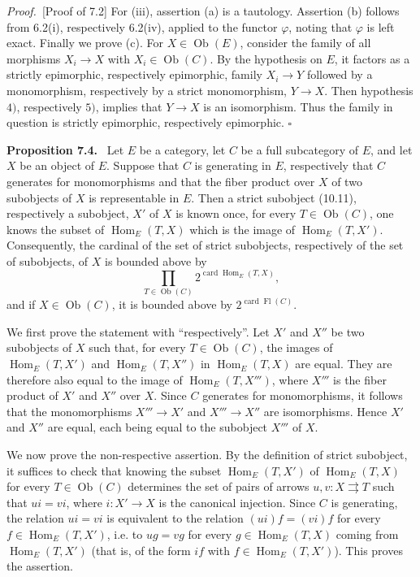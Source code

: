 \documentclass[11pt]{article}
\newcommand{\Ob}{\operatorname{Ob}}
\newcommand{\Hom}{\operatorname{Hom}}
\newcommand{\Fl}{\operatorname{Fl}}
\newcommand{\card}{\operatorname{card}}
\newcommand{\qedtext}{\hfill\(\square\)}
\newenvironment{statement}[1]{\par\medskip\noindent\textbf{#1.}\ }{\par\medskip}
\newenvironment{proofsketch}{\par\noindent\emph{Proof.}\ }{\par\medskip}
\begin{document}
\begin{proofsketch}[Proof of 7.2]
For (iii), assertion (a) is a tautology. Assertion (b) follows from 6.2(i), respectively 6.2(iv), applied to the functor $\varphi$, noting that $\varphi$ is left exact. Finally we prove (c). For $X\in\Ob(E)$, consider the family of all morphisms $X_i\to X$ with $X_i\in\Ob(C)$. By the hypothesis on $E$, it factors as a strictly epimorphic, respectively epimorphic, family $X_i\to Y$ followed by a monomorphism, respectively by a strict monomorphism, $Y\to X$. Then hypothesis $4)$, respectively $5)$, implies that $Y\to X$ is an isomorphism. Thus the family in question is strictly epimorphic, respectively epimorphic. \qedtext
\end{proofsketch}

\begin{statement}{Proposition 7.4}
Let $E$ be a category, let $C$ be a full subcategory of $E$, and let $X$ be an object of $E$. Suppose that $C$ is generating in $E$, respectively that $C$ generates for monomorphisms and that the fiber product over $X$ of two subobjects of $X$ is representable in $E$. Then a strict subobject (10.11), respectively a subobject, $X'$ of $X$ is known once, for every $T\in\Ob(C)$, one knows the subset of $\Hom_E(T,X)$ which is the image of $\Hom_E(T,X')$. Consequently, the cardinal of the set of strict subobjects, respectively of the set of subobjects, of $X$ is bounded above by
\[
\prod_{T\in\Ob(C)}2^{\card\Hom_E(T,X)},
\]
and if $X\in\Ob(C)$, it is bounded above by $2^{\card \Fl(C)}$.
\end{statement}

We first prove the statement with ``respectively''. Let $X'$ and $X''$ be two subobjects of $X$ such that, for every $T\in\Ob(C)$, the images of $\Hom_E(T,X')$ and $\Hom_E(T,X'')$ in $\Hom_E(T,X)$ are equal. They are therefore also equal to the image of $\Hom_E(T,X''')$, where $X'''$ is the fiber product of $X'$ and $X''$ over $X$. Since $C$ generates for monomorphisms, it follows that the monomorphisms $X'''\to X'$ and $X'''\to X''$ are isomorphisms. Hence $X'$ and $X''$ are equal, each being equal to the subobject $X'''$ of $X$.

We now prove the non-respective assertion. By the definition of strict subobject, it suffices to check that knowing the subset $\Hom_E(T,X')$ of $\Hom_E(T,X)$ for every $T\in\Ob(C)$ determines the set of pairs of arrows $u,v:X\rightrightarrows T$ such that $ui=vi$, where $i:X'\to X$ is the canonical injection. Since $C$ is generating, the relation $ui=vi$ is equivalent to the relation $(ui)f=(vi)f$ for every $f\in\Hom_E(T,X')$, i.e. to $ug=vg$ for every $g\in\Hom_E(T,X)$ coming from $\Hom_E(T,X')$ (that is, of the form $if$ with $f\in\Hom_E(T,X')$). This proves the assertion.
\end{document}
